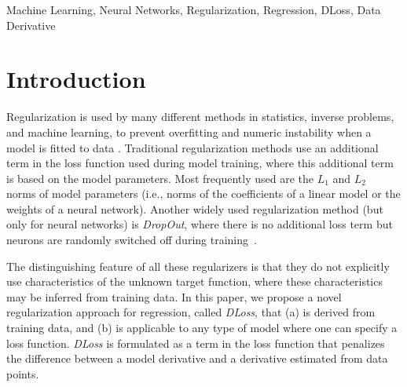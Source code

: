 \documentclass[conference]{IEEEtran}
\begin{document}
\begin{abstract}
In this work, we introduce a novel approach to regularization in multivariable regression problems. 
Our regularizer, called \emph{DLoss}, penalizes differences between the model's derivatives and derivatives of the data generating function as estimated from the training data. 
We call these estimated derivatives \emph{data derivatives}. 
The goal of our method is to align the model to the data, not only in terms of target values but also in terms of the derivatives involved. 
To estimate data derivatives, we select (from the training data) 2-tuples of input-value pairs, using either nearest neighbor or random selection. 
We evaluate the effectiveness of \emph{DLoss} on synthetic and real datasets with different weights, to the standard mean squared error loss. 
The experimental results show that with \emph{DLoss} (using nearest neighbor selection) we obtain, on average, the best rank with respect to MSE on validation data sets, compared to no regularization, $L_2$ regularization, and Dropout. 
Our implementation code is available on Github.
\end{abstract}

\begin{IEEEkeywords}
Machine Learning, Neural Networks, Regularization, Regression, DLoss, Data Derivative
\end{IEEEkeywords}


\section{Introduction}
\label{introduction}

Regularization is used by many different methods in statistics, inverse problems, and machine learning, to prevent overfitting and numeric instability when a model is fitted to data \cite{Kukacka2017regsurvey}.
Traditional regularization methods use an additional term in the loss function used during model training, where this additional term is based on the model parameters. 
Most frequently used are the $L_1$ \cite{tibshirani1996L1} and $L_2$~\cite{TikhonovL2} norms of model parameters (i.e., norms of the coefficients of a linear model or the weights of a neural network). 
Another widely used regularization method (but only for neural networks) is \emph{DropOut}, where there is no additional loss term but neurons are randomly switched off during training~\cite{hinton2012L2,srivastava2014dropout}.

The distinguishing feature of all these regularizers is that they do not explicitly use characteristics of the unknown target function, where these characteristics may be inferred from training data. 
In this paper, we propose a novel regularization approach for regression, called \emph{DLoss}, that (a) is derived from training data, and (b) is applicable to any type of model where one can specify a loss function.
\emph{DLoss} is formulated as a term in the loss function that penalizes the difference between a model derivative and a derivative estimated from data points. 
\end{document}
